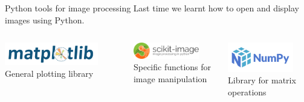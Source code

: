 \documentclass[9pt, aspectratio=169]{beamer}
\begin{document}
\begin{frame}
    {Python tools for image processing}
    \centering
    Last time we learnt how to open and display images using Python.

    \vspace{3em}

    \begin{columns}
        \begin{column}{0.3\textwidth}
            \includegraphics[width=0.8\textwidth]{matplotlib_logo.png}
            General plotting library
        \end{column}
        \begin{column}{0.3\textwidth}
            \includegraphics[width=0.8\textwidth]{skimage_logo.png}
            Specific functions for image manipulation
        \end{column}
        \begin{column}{0.3\textwidth}
            \includegraphics[width=0.8\textwidth]{numpylogo.png}
            Library for matrix operations
        \end{column}
    \end{columns}
\end{frame}
\end{document}
